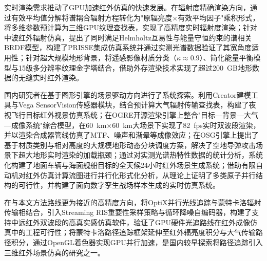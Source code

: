 实时渲染需求推动了GPU加速红外仿真的快速发展。在辐射度精确渲染方向，\citeauthor{huangGPUbasedHighprecisionRealtime2014}通过有效平均值分解将谱耦合辐射方程转化为"原辐亮度$\times$有效平均因子"乘积形式，将多维参数预计算为三维GPU纹理查找表，实现了高精度实时辐射度渲染\cite{huangGPUbasedHighprecisionRealtime2014}；\citeauthor{wuRealtimeMidwavelengthInfrared2015}针对中波红外辐射仿真，提出了同时满足Helmholtz互易性与能量守恒约束的谱相关BRDF模型，构建了PRISSE集成仿真系统并通过实测光谱数据验证了其宽角度适用性\cite{wuRealtimeMidwavelengthInfrared2015}；\citeauthor{liRealtimeMultiresolutionRendering2018}针对超大规模地形背景，将遥感影像材质分类（$\kappa\approx0.9$）、简化能量平衡模型与15级多分辨率纹理金字塔结合，借助外存渲染技术实现了超过200~GB地形数据的无缝实时红外渲染\cite{liRealtimeMultiresolutionRendering2018}。

国内研究者在基于图形引擎的场景驱动方向进行了系统探索。\citeauthor{PanXuePingJiYuCreatorHeVegaDeHongWaiFeiXingShiJingFangZhen2007}利用Creator建模工具与Vega SensorVision传感器模块，结合预计算大气辐射传输查找表，构建了夜视飞行目标红外视景仿真系统\cite{PanXuePingJiYuCreatorHeVegaDeHongWaiFeiXingShiJingFangZhen2007}；\citeauthor{LinKaiJiYuOGREDeDongTaiHongWaiChangJingFangZhenYanJiu2010}在OGRE开源渲染引擎上整合"目标—背景—大气—成像系统"综合模型，在60~km$\times$60~km大场景下实现了82~fps实时双波段渲染，并以渲染合成器管线仿真了MTF、噪声和渐晕等成像效应\cite{LinKaiJiYuOGREDeDongTaiHongWaiChangJingFangZhenYanJiu2010}；\citeauthor{YangBoJiYuOSGDeHongWaiShiJingFangZhenYanJiu2017}在OSG引擎上提出了基于材质类别与相对高度的大规模地形动态分块调度方案，解决了空地导弹攻击场景下超大地形实时渲染的加载瓶颈\cite{YangBoJiYuOSGDeHongWaiShiJingFangZhenYanJiu2017}；\citeauthor{WangJunDiHaiMianHongWaiChangJingShengChengJiShuYanJiu2020}通过对实测光谱热特性数据的统计分析，系统化构建了地面车辆与海面舰船目标的全天候24小时红外场景生成系统\cite{WangJunDiHaiMianHongWaiChangJingShengChengJiShuYanJiu2020}；\citeauthor{LiWeiQingMianXiangShuZiLuanShengZhanChangDeHongWaiChangJingShiShiFangZhenFangFa2022}借助有限自动机对红外仿真计算流图进行并行化形式化分析，从理论上证明了多类原子并行结构的可行性，并构建了面向数字孪生战场样本生成的实时仿真系统\cite{LiWeiQingMianXiangShuZiLuanShengZhanChangDeHongWaiChangJingShiShiFangZhenFangFa2022}。

在与本文方法路线更为接近的高精度方向，\citeauthor{XuFeiFanJiYuOptiXBingXingGuangXianZhuiZongJiSuanDeHongWaiChengXiangFangZhenRuanJianYanZhi2022}将OptiX并行光线追踪与蒙特卡洛辐射传输相结合，引入Streaming RIS重要性采样策略与循环降噪自编码器，构建了支持中远红外双波段的高真实感仿真软件，验证了GPU硬件光追路线在红外成像仿真中的工程可行性\cite{XuFeiFanJiYuOptiXBingXingGuangXianZhuiZongJiSuanDeHongWaiChengXiangFangZhenRuanJianYanZhi2022}；\citeauthor{YuLiangYuJiYuLuJingZhuiZongDeSanWeiHongWaiChangJingFangZhenSuanFaJiShiXian2020}将蒙特卡洛路径追踪框架延伸至红外辐亮度积分与大气传输路径积分，通过OpenGL着色器实现GPU并行加速，是国内较早探索将路径追踪引入三维红外场景仿真的研究之一\cite{YuLiangYuJiYuLuJingZhuiZongDeSanWeiHongWaiChangJingFangZhenSuanFaJiShiXian2020}。

